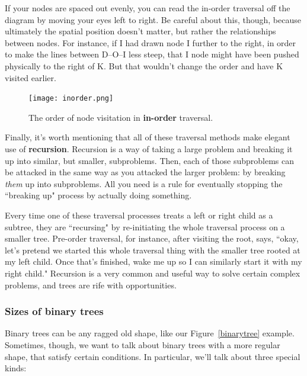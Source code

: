 If your nodes are spaced out evenly, you can read the in-order traversal
off the diagram by moving your eyes left to right. Be careful about this,
though, because ultimately the spatial position doesn't matter, but rather
the relationships between nodes. For instance, if I had drawn node I
further to the right, in order to make the lines between D--O--I less
steep, that I node might have been pushed physically to the right of K. But
that wouldn't change the order and have K visited earlier.

\begin{figure}[ht]
\centering
\texttt{[image: inorder.png]}
\caption{The order of node visitation in \textbf{in-order} traversal.}
\label{inorder}
\end{figure}

Finally, it's worth mentioning that all of these traversal methods make
elegant use of \textbf{recursion}. Recursion is a way of taking a large
problem and breaking it up into similar, but smaller, subproblems. Then,
each of those subproblems can be attacked in the same way as you attacked
the larger problem: by breaking \textit{them} up into subproblems. All you
need is a rule for eventually stopping the ``breaking up" process by
actually doing something.

Every time one of these traversal processes treats a left or right child as
a subtree, they are ``recursing" by re-initiating the whole traversal
process on a smaller tree. Pre-order traversal, for instance, after
visiting the root, says, ``okay, let's pretend we started this whole
traversal thing with the smaller tree rooted at my left child. Once that's
finished, wake me up so I can similarly start it with my right child."
Recursion is a very common and useful way to solve certain complex
problems, and trees are rife with opportunities.


\subsubsection{Sizes of binary trees}

Binary trees can be any ragged old shape, like our Figure~\ref{binarytree}
example. Sometimes, though, we want to talk about binary trees with a more
regular shape, that satisfy certain conditions. In particular, we'll talk
about three special kinds:

